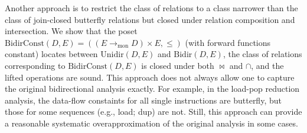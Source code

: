 \documentclass{easychair}
\theoremstyle{definition}
\newcommand{\Bidir}{\mathrm{Bidir}}
\newcommand{\Unidir}{\mathrm{Unidir}}
\newcommand{\UnidirConst}{\mathrm{BidirConst}}
\newcommand{\tomon}{\to_{\mathrm{mon}}}
\begin{document}
Another approach is to restrict the class of relations to a class narrower than the class of join-closed butterfly relations but closed under relation composition and intersection. We show that the poset $\UnidirConst(D, E) = ((E \tomon D) \times E, \leq)$ (with forward functions constant) locates between $\Unidir(D , E)$ and $\Bidir(D, E)$, the class of relations corresponding to $\UnidirConst(D, E)$ is  closed under both $\bowtie$ and $\cap$, and the lifted operations are sound.
This approach does not always allow one to capture the original bidirectional analysis exactly. For example, in the load-pop reduction analysis, the data-flow constaints for all single instructions are butterfly, but those for some sequences (e.g., \textsf{load}; \textsf{dup}) are not. Still, this approach can provide a reasonable systematic overapproximation of the original analysis in some cases.



\end{document}
